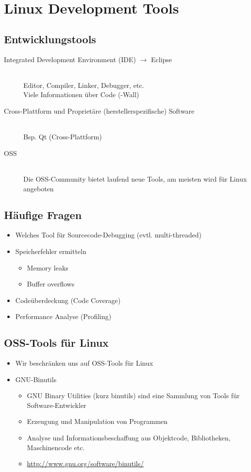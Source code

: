 \section{Linux Development Tools}
\subsection{Entwicklungstools}
\begin{description}
    \item [Integrated Development Environment (IDE) $\rightarrow$ Eclipse] \hfill \\
    Editor, Compiler, Linker, Debugger, etc. \\
    Viele Informationen über Code (-Wall)
    \item [Cross-Plattform und Proprietäre (herstellerspezifische) Software] \hfill \\
    Bsp. Qt (Cross-Plattform)
    \item [OSS]\\
    Die OSS-Community bietet laufend neue Tools, am meisten wird für Linux angeboten
\end{description}

\subsection{Häufige Fragen}
\begin{itemize}
  \item Welches Tool für Sourcecode-Debugging (evtl. multi-threaded)
  \item Speicherfehler ermitteln
  \begin{itemize}
    \item Memory leaks
    \item Buffer overflows
  \end{itemize}
  \item Codeüberdeckung (Code Coverage)
  \item Performance Analyse (Profiling)
\end{itemize}

\subsection{OSS-Tools für Linux}
\begin{itemize}
  \item Wir beschränken uns auf OSS-Tools für Linux
  \item GNU-Binutils
  \begin{itemize}
    \item GNU Binary Utilities (kurz binutils) sind eine Sammlung von Tools für Software-Entwickler
    \item Erzeugung und Manipulation von Programmen
    \item Analyse und Informationsbeschaffung aus Objektcode, Bibliotheken, Maschinencode etc.
    \item \url{http://www.gnu.org/software/binutils/}
  \end{itemize}
\end{itemize}

